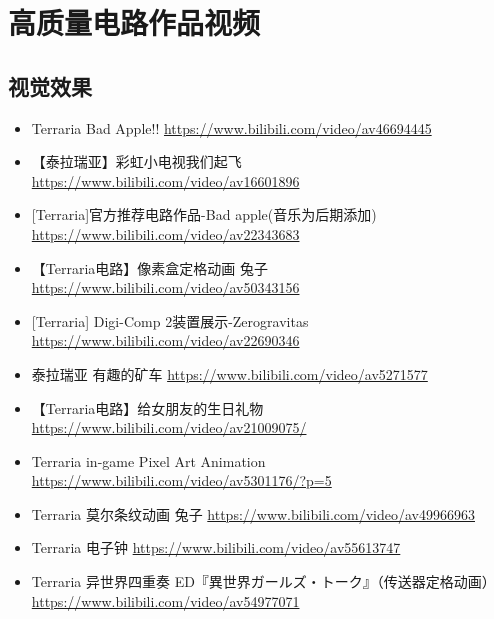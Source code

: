\chapter{高质量电路作品视频}
\section{视觉效果}
\begin{itemize}
\item Terraria Bad Apple!! \url{https://www.bilibili.com/video/av46694445}
\item 【泰拉瑞亚】彩虹小电视我们起飞 \url{https://www.bilibili.com/video/av16601896}
\item {[}Terraria]官方推荐电路作品-Bad apple(音乐为后期添加) \url{https://www.bilibili.com/video/av22343683}
\item 【Terraria电路】像素盒定格动画 兔子 \url{https://www.bilibili.com/video/av50343156}
\item {[}Terraria] Digi-Comp 2装置展示-Zerogravitas \url{https://www.bilibili.com/video/av22690346}
\item 泰拉瑞亚 有趣的矿车 \url{https://www.bilibili.com/video/av5271577}
\item 【Terraria电路】给女朋友的生日礼物 \url{https://www.bilibili.com/video/av21009075/}
\item Terraria in-game Pixel Art Animation \url{https://www.bilibili.com/video/av5301176/?p=5}
\item Terraria 莫尔条纹动画 兔子 \url{https://www.bilibili.com/video/av49966963}
\item Terraria 电子钟 \url{https://www.bilibili.com/video/av55613747}
\item Terraria 异世界四重奏 ED『異世界ガールズ・トーク』（传送器定格动画） \url{https://www.bilibili.com/video/av54977071}
\end{itemize}

